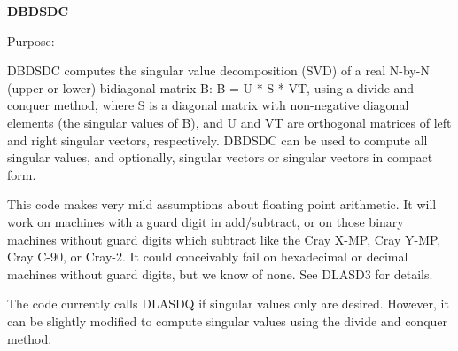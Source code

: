 {\bfseries D\+B\+D\+S\+D\+C} 

 \begin{DoxyParagraph}{Purpose\+: }
\begin{DoxyVerb} DBDSDC computes the singular value decomposition (SVD) of a real
 N-by-N (upper or lower) bidiagonal matrix B:  B = U * S * VT,
 using a divide and conquer method, where S is a diagonal matrix
 with non-negative diagonal elements (the singular values of B), and
 U and VT are orthogonal matrices of left and right singular vectors,
 respectively. DBDSDC can be used to compute all singular values,
 and optionally, singular vectors or singular vectors in compact form.

 This code makes very mild assumptions about floating point
 arithmetic. It will work on machines with a guard digit in
 add/subtract, or on those binary machines without guard digits
 which subtract like the Cray X-MP, Cray Y-MP, Cray C-90, or Cray-2.
 It could conceivably fail on hexadecimal or decimal machines
 without guard digits, but we know of none.  See DLASD3 for details.

 The code currently calls DLASDQ if singular values only are desired.
 However, it can be slightly modified to compute singular values
 using the divide and conquer method.\end{DoxyVerb}
 
\end{DoxyParagraph}

